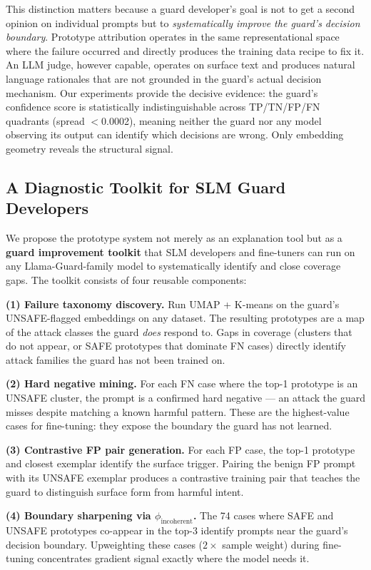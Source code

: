 \documentclass[letterpaper]{article}
\begin{document}
This distinction matters because a guard developer's goal is not to get a second opinion
on individual prompts but to \emph{systematically improve the guard's decision boundary}.
Prototype attribution operates in the same representational space where the failure
occurred and directly produces the training data recipe to fix it.
An LLM judge, however capable, operates on surface text and produces natural language
rationales that are not grounded in the guard's actual decision mechanism.
Our experiments provide the decisive evidence: the guard's confidence score is
statistically indistinguishable across TP/TN/FP/FN quadrants (spread $<$0.0002),
meaning neither the guard nor any model observing its output can identify which
decisions are wrong. Only embedding geometry reveals the structural signal.

\subsection{A Diagnostic Toolkit for SLM Guard Developers}
\label{sec:toolkit}

We propose the prototype system not merely as an explanation tool but as a
\textbf{guard improvement toolkit} that SLM developers and fine-tuners can run
on any Llama-Guard-family model to systematically identify and close coverage gaps.
The toolkit consists of four reusable components:

\textbf{(1) Failure taxonomy discovery.} Run UMAP + K-means on the guard's
UNSAFE-flagged embeddings on any dataset. The resulting prototypes are a map of the
attack classes the guard \emph{does} respond to. Gaps in coverage (clusters that do
not appear, or SAFE prototypes that dominate FN cases) directly identify attack families
the guard has not been trained on.

\textbf{(2) Hard negative mining.} For each FN case where the top-1 prototype is
an UNSAFE cluster, the prompt is a confirmed hard negative --- an attack the guard
misses despite matching a known harmful pattern. These are the highest-value cases for
fine-tuning: they expose the boundary the guard has not learned.

\textbf{(3) Contrastive FP pair generation.} For each FP case, the top-1 prototype and
closest exemplar identify the surface trigger. Pairing the benign FP prompt with its
UNSAFE exemplar produces a contrastive training pair that teaches the guard to
distinguish surface form from harmful intent.

\textbf{(4) Boundary sharpening via $\phi_\text{incoherent}$.} The 74 cases where
SAFE and UNSAFE prototypes co-appear in the top-3 identify prompts near the guard's
decision boundary. Upweighting these cases ($2\times$ sample weight)
during fine-tuning concentrates gradient signal exactly where the model needs it.
\end{document}
